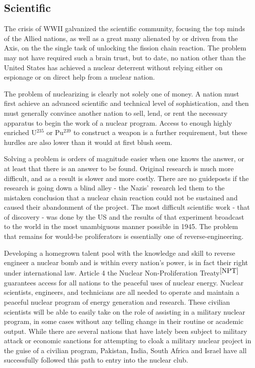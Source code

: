 \documentclass[journal]{IEEEtran}
\begin{document}
\subsection{Scientific}
The crisis of WWII galvanized the scientific community, focusing the top minds of the Allied nations, as well as a great many alienated by or driven from the Axis, on the the single task of unlocking the fission chain reaction.  The problem may not have required such a brain trust, but to date, no nation other than the United States has achieved a nuclear deterrent without relying either on espionage or on direct help from a nuclear nation.\par
The problem of nuclearizing is clearly not solely one of money.  A nation must first achieve an advanced scientific and technical level of sophistication, and then must generally convince another nation to sell, lend, or rent the necessary apparatus to begin the work of a nuclear program.  Access to enough highly enriched U$^{235}$ or Pu$^{239}$ to construct a weapon is a further requirement, but these hurdles are also lower than it would at first blush seem.\par
Solving a problem is orders of magnitude easier when one knows the answer, or at least that there is an answer to be found.  Original research is much more difficult, and as a result is slower and more costly.  There are no guideposts if the research is going down a blind alley - the Nazis' research led them to the mistaken conclusion that a nuclear chain reaction could not be sustained and caused their abandonment of the project.  The most difficult scientific work - that of discovery - was done by the US and the results of that experiment broadcast to the world in the most unambiguous manner possible in 1945.  The problem that remains for would-be proliferators is essentially one of reverse-engineering.\par
Developing a homegrown talent pool with the knowledge and skill to reverse engineer a nuclear bomb and is within every nation's power, is in fact their right under international law.  Article 4 the Nuclear Non-Proliferation Treaty$^{\cite{NPT}}$ guarantees access for all nations to the peaceful uses of nuclear energy.  Nuclear scientists, engineers, and technicians are all needed to operate and maintain a peaceful nuclear program of energy generation and research.  These civilian scientists will be able to easily take on the role of assisting in a military nuclear program, in some cases without any telling change in their routine or academic output.  While there are several nations that have lately been subject to military attack or economic sanctions for attempting to cloak a military nuclear project in the guise of a civilian program, Pakistan, India, South Africa and Israel have all successfully followed this path to entry into the nuclear club.\par
\end{document}
